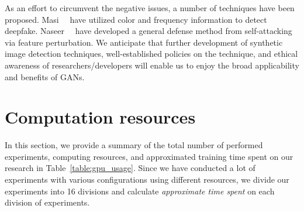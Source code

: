 \documentclass{article}
\begin{document}
As an effort to circumvent the negative issues, a number of techniques have been proposed. Masi~\etal~\cite{masi2020two} have utilized color and frequency information to detect deepfake. Naseer~\etal~\cite{naseer2020self} have developed a general defense method from self-attacking via feature perturbation. We anticipate that further development of synthetic image detection techniques, well-established policies on the technique, and ethical awareness of researchers/developers will enable us to enjoy the broad applicability and benefits of GANs. \section{Computation resources}
In this section, we provide a summary of the total number of performed experiments, computing resources, and approximated training time spent on our research in Table~\ref{table:gpu_usage}. Since we have conducted a lot of experiments with various configurations using different resources, we divide our experiments into 16 divisions and calculate \emph{approximate time spent} on each division of experiments.
\end{document}
